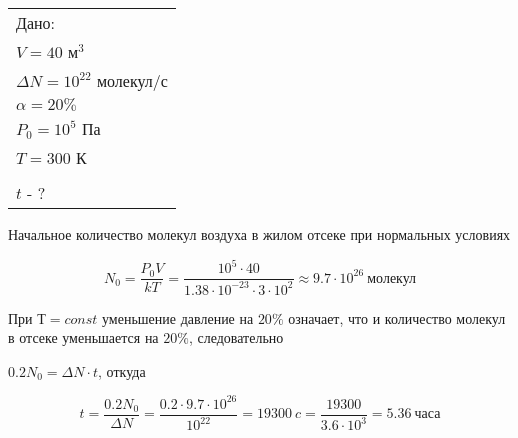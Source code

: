 \solutionSection

\begin{tabular}{l|}
    Дано: \\
    $V = 40$ м$^3$ \\
    $\Delta N = 10^{22}$ молекул/с \\
    $\alpha= 20\%$ \\
    $P_0 = 10^5$ Па \\
    $T = 300$ К \\
    \hline \\
    $t$ - ?
\end{tabular}

Начальное количество молекул воздуха в жилом отсеке при нормальных условиях

$$N_0 = \frac{P_0V}{kT} = \frac{10^5 \cdot 40}{1.38 \cdot 10^{-23} \cdot 3 \cdot 10^2} \approx 9.7 \cdot 10^{26} \: \text{молекул}$$

При $Т=const$ уменьшение давление на $20\%$ означает, что и количество молекул в отсеке уменьшается на $20\%$, следовательно 
 
$0.2 N_0 = \Delta N \cdot t$, откуда

$$t = \frac{0.2 N_0}{\Delta N} = \frac{0.2 \cdot 9.7 \cdot 10^{26}}{10^{22}} = 19300 \: c = \frac{19300}{3.6 \cdot 10^3} = 5.36 \: \text{часа}$$

